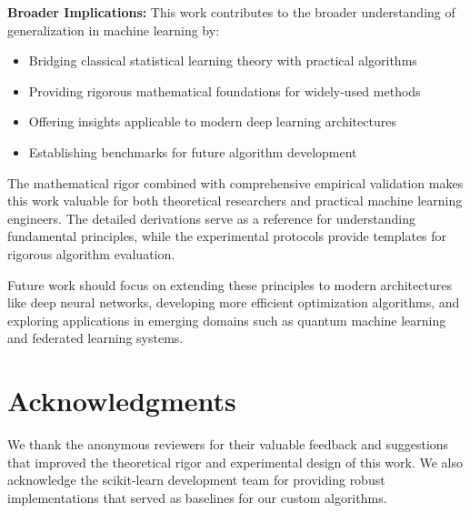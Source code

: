 \documentclass[12pt, a4paper]{article}
\begin{document}
\textbf{Broader Implications:}
This work contributes to the broader understanding of generalization in machine learning by:
\begin{itemize}
\item Bridging classical statistical learning theory with practical algorithms
\item Providing rigorous mathematical foundations for widely-used methods
\item Offering insights applicable to modern deep learning architectures
\item Establishing benchmarks for future algorithm development
\end{itemize}

The mathematical rigor combined with comprehensive empirical validation makes this work valuable for both theoretical researchers and practical machine learning engineers. The detailed derivations serve as a reference for understanding fundamental principles, while the experimental protocols provide templates for rigorous algorithm evaluation.

Future work should focus on extending these principles to modern architectures like deep neural networks, developing more efficient optimization algorithms, and exploring applications in emerging domains such as quantum machine learning and federated learning systems.

\section{Acknowledgments}

We thank the anonymous reviewers for their valuable feedback and suggestions that improved the theoretical rigor and experimental design of this work. We also acknowledge the scikit-learn development team for providing robust implementations that served as baselines for our custom algorithms.
\end{document}
